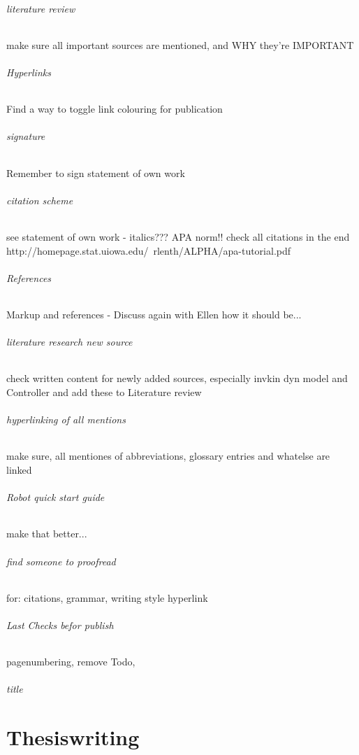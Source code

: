 \paragraph{literature review}
make sure all important sources are mentioned, and WHY they're IMPORTANT

\paragraph{Hyperlinks}
Find a way to toggle link colouring for publication

\paragraph{signature}
Remember to sign statement of own work

\paragraph{citation scheme}
see statement of own work - italics???
APA norm!! check all citations in the end
http://homepage.stat.uiowa.edu/~rlenth/ALPHA/apa-tutorial.pdf

\paragraph{References}
Markup and references - Discuss again with Ellen how it should be...

\paragraph{literature research new source}
check written content for newly added sources, especially invkin dyn model and Controller and add these to Literature review

\paragraph{hyperlinking of all mentions}
make sure, all mentiones of abbreviations, glossary entries and whatelse are linked

\paragraph{Robot quick start guide}
make that better...

\paragraph{find someone to proofread}
for:
citations,
grammar,
writing style
hyperlink

\paragraph{Last Checks befor publish}
pagenumbering,
remove Todo,

\paragraph{title}


\cleardoublepage
\part{Thesiswriting}
\cleardoublepage